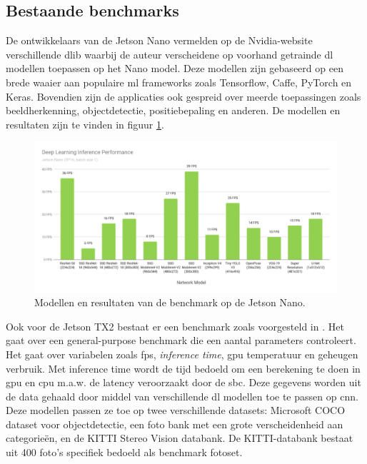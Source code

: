 	\subsection{Bestaande benchmarks}
	De ontwikkelaars van de Jetson Nano vermelden op de Nvidia-website\cite{bron:nanobenchmark} verschillende \gls{dlib} waarbij de auteur verscheidene op voorhand getrainde \gls{dl} modellen toepassen op het Nano model. Deze modellen zijn gebaseerd op een brede waaier aan populaire \gls{ml} frameworks zoals Tensorflow, Caffe, PyTorch en Keras. Bovendien zijn de applicaties ook gespreid over meerde toepassingen zoals beeldherkenning, objectdetectie, positiebepaling en anderen. De modellen en resultaten zijn te vinden in figuur \ref{fig:nanobenchmark}.

	\begin{figure}
		\centering
		\includegraphics{afbeeldingen/NanoBenchmark.png}
		\caption{Modellen en resultaten van de benchmark op de Jetson Nano\cite{bron:nanobenchmark}.}
		\label{fig:nanobenchmark}
	\end{figure}

	Ook voor de Jetson TX2 bestaat er een benchmark zoals voorgesteld in \cite{bordignonbenchmarking}. Het gaat over een general-purpose benchmark die een aantal parameters controleert. Het gaat over variabelen zoals \gls{fps}, \textit{inference time}, \gls{gpu} temperatuur en geheugen verbruik. Met inference time wordt de tijd bedoeld om een berekening te doen in \gls{gpu} en \gls{cpu} m.a.w. de latency veroorzaakt door de \gls{sbc}. Deze gegevens worden uit de data gehaald door middel van verschillende \gls{dl} modellen toe te passen op \gls{cnn}. Deze modellen passen ze toe op twee verschillende datasets: Microsoft COCO dataset voor objectdetectie, een foto bank met een grote verscheidenheid aan categorie\"en, en de KITTI Stereo Vision databank. De KITTI-databank bestaat uit 400 foto's specifiek bedoeld als benchmark fotoset.
	





	

